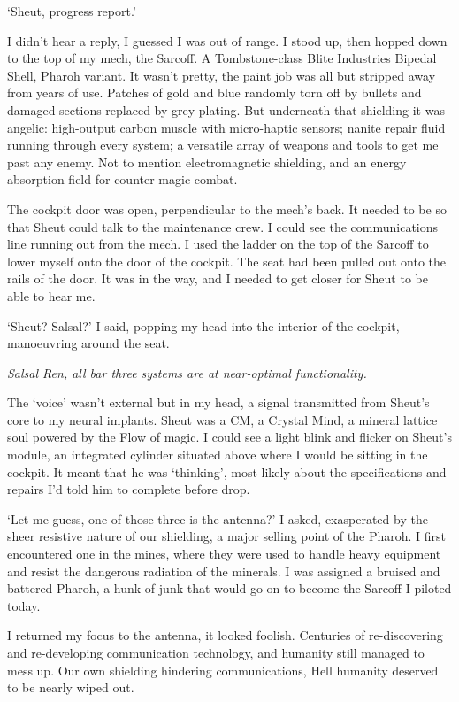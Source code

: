 `Sheut, progress report.'

I didn't hear a reply, I guessed I was out of range. I stood up, then hopped down to the top of my mech, the Sarcoff. A Tombstone-class Blite Industries Bipedal Shell, Pharoh variant. It wasn't pretty, the paint job was all but stripped away from years of use. Patches of gold and blue randomly torn off by bullets and damaged sections replaced by grey plating. But underneath that shielding it was angelic: high-output carbon muscle with micro-haptic sensors; nanite repair fluid running through every system; a versatile array of weapons and tools to get me past any enemy. Not to mention electromagnetic shielding, and an energy absorption field for counter-magic combat.

The cockpit door was open, perpendicular to the mech's back. It needed to be so that Sheut could talk to the maintenance crew. I could see the communications line running out from the mech. I used the ladder on the top of the Sarcoff to lower myself onto the door of the cockpit. The seat had been pulled out onto the rails of the door. It was in the way, and I needed to get closer for Sheut to be able to hear me.

`Sheut? Salsal?' I said, popping my head into the interior of the cockpit, manoeuvring around the seat.

{\it Salsal Ren, all bar three systems are at near-optimal functionality.}

The `voice' wasn't external but in my head, a signal transmitted from Sheut's core to my neural implants. Sheut was a CM, a Crystal Mind, a mineral lattice soul powered by the Flow of magic. I could see a light blink and flicker on Sheut's module, an integrated cylinder situated above where I would be sitting in the cockpit. It meant that he was `thinking', most likely about the specifications and repairs I'd told him to complete before drop.

`Let me guess, one of those three is the antenna?' I asked, exasperated by the sheer resistive nature of our shielding, a major selling point of the Pharoh. I first encountered one in the mines, where they were used to handle heavy equipment and resist the dangerous radiation of the minerals. I was assigned a bruised and battered Pharoh, a hunk of junk that would go on to become the Sarcoff I piloted today.

I returned my focus to the antenna, it looked foolish. Centuries of re-discovering and re-developing communication technology, and humanity still managed to mess up. Our own shielding hindering communications, Hell humanity deserved to be nearly wiped out.

